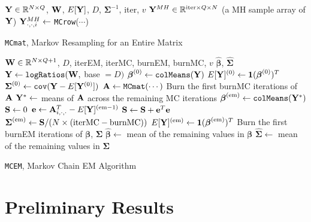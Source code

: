 \documentclass{template}
\begin{document}
\begin{algorithm}[ht!]
\begin{algorithmic}[1]
\Input $\mathbf{Y}\in\mathbb{R}^{N\times Q}$, $\mathbf{W}$, $E[\mathbf{Y}]$, $D$, $\boldsymbol{\Sigma}^{-1}$, iter, $v$
\Output $\mathbf{Y}^{MH}\in\mathbb{R}^{\text{iter}\times Q\times N}$ (a MH sample array of $\mathbf{Y}$)
\State $\mathbf{Y}^{MH}_{\cdot,\cdot,i} \gets$ \texttt{MCrow}($\cdots$)
\EndFor
{}
\end{algorithmic}
\caption{\texttt{MCmat}, Markov Resampling for an Entire Matrix}
\end{algorithm}


\begin{algorithm}[ht!]
\begin{algorithmic}[1]
\Input  $\mathbf{W}\in\mathbb{R}^{N\times Q+1}$, $D$,  iterEM, iterMC, burnEM, burnMC, $v$
\Output $\hat{\boldsymbol{\beta}}$, $\hat{\boldsymbol{\Sigma}}$
\State $\mathbf{Y}\gets \texttt{logRatios}(\mathbf{W},$ base $=D)$
\State $\boldsymbol{\beta}^{(0)} \gets \texttt{colMeans}(\mathbf{Y})$
\State $E[\mathbf{Y}]^{(0)} \gets \mathbf{1}(\boldsymbol{\beta}^{(0)})^T$
\State $\boldsymbol{\Sigma}^{(0)} \gets \texttt{cov}(\mathbf{Y}-E[\mathbf{Y}^{(0)}])$
\State $\mathbf{A}\gets \texttt{MCmat}(\cdots)$
\State Burn the first burnMC iterations of $\mathbf{A}$
\State $\mathbf{Y}^*\gets$ means of $\mathbf{A}$ across the remaining MC iterations
\State $\boldsymbol{\beta}^{(\text{em})} \gets \texttt{colMeans}(\mathbf{Y}^*)$
\State $\mathbf{S}\gets 0$
\State $\mathbf{e}\gets \mathbf{A}_{i,\cdot,\cdot}^T-E[\mathbf{Y}]^{(\text{em}-1)}$
\State $\mathbf{S}\gets \mathbf{S}+\mathbf{e}^T\mathbf{e}$
\EndFor
\State $\boldsymbol{\Sigma}^{(\text{em})}\gets \mathbf{S}/(N\times (\text{iterMC}-\text{burnMC}))$
\State $E[\mathbf{Y}]^{(\text{em})} \gets \mathbf{1}(\boldsymbol{\beta}^{(\text{em})})^T$
\EndFor
\State Burn the first burnEM iterations of $\boldsymbol{\beta}$, $\boldsymbol{\Sigma}$
\State $\hat{\boldsymbol{\beta}}\gets$ mean of the remaining values in $\boldsymbol{\beta}$
\State $\hat{\boldsymbol{\Sigma}}\gets$ mean of the remaining values in $\boldsymbol{\Sigma}$
\end{algorithmic}
\caption{\texttt{MCEM}, Markov Chain EM Algorithm}
\end{algorithm}



\FloatBarrier

\newpage

\section{Preliminary Results}
\end{document}
